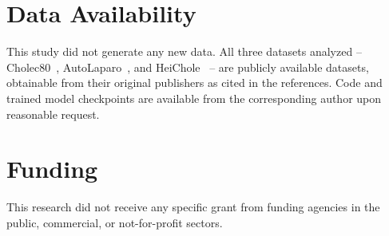 \documentclass[preprint,12pt]{elsarticle}
\begin{document}
\section*{Data Availability}
This study did not generate any new data. All three datasets analyzed -- Cholec80~\cite{twinanda2017endonet}, AutoLaparo~\cite{wang2022autolaparo}, and HeiChole~\cite{wagner2023heichole} -- are publicly available datasets, obtainable from their original publishers as cited in the references. Code and trained model checkpoints are available from the corresponding author upon reasonable request.

\section*{Funding}
This research did not receive any specific grant from funding agencies in the public, commercial, or not-for-profit sectors.



\end{document}
